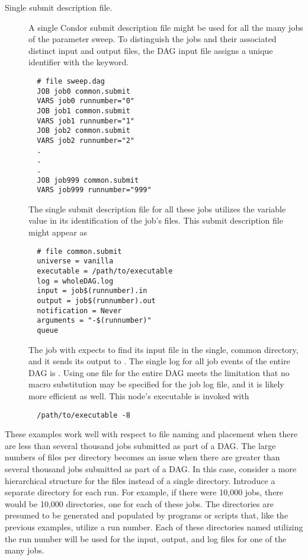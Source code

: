 \begin{description}
\item[Single submit description file.]
A single Condor submit description file might be used for all the many
jobs of the parameter sweep.
To distinguish the jobs and their associated distinct input and output files,
the DAG input file assigns a unique identifier with the  keyword.
\begin{verbatim}
  # file sweep.dag
  JOB job0 common.submit
  VARS job0 runnumber="0"
  JOB job1 common.submit
  VARS job1 runnumber="1"
  JOB job2 common.submit
  VARS job2 runnumber="2"
  .
  .
  .
  JOB job999 common.submit
  VARS job999 runnumber="999"
\end{verbatim}

The single submit description file for all these jobs utilizes the
 variable value in its identification of the job's
files. 
This submit description file might appear as
\begin{verbatim}
  # file common.submit
  universe = vanilla
  executable = /path/to/executable
  log = wholeDAG.log
  input = job$(runnumber).in
  output = job$(runnumber).out
  notification = Never
  arguments = "-$(runnumber)"
  queue
\end{verbatim}
The job with  expects to find its input file  
in the single, common directory, and it 
sends its output to .
The single log for all job events of the entire DAG is .
Using one file for the entire DAG meets the limitation that no macro
substitution may be specified for the job log file, 
and it is likely more efficient as well. 
This node's executable is invoked with
\begin{verbatim}
  /path/to/executable -8
\end{verbatim}

\end{description}

These examples work well with respect to file naming and placement
when there are less than several thousand jobs submitted as part
of a DAG.
The large numbers of files per directory becomes an issue when there
are greater than several thousand jobs submitted as part of a DAG.
In this case,
consider a more hierarchical structure for the files instead of a single
directory.
Introduce a separate directory for each run.
For example, if there were 10,000 jobs, there would be
10,000 directories, one for each of these jobs.
The directories are presumed to be generated and populated by 
programs or scripts that,
like the previous examples, utilize a run number.
Each of these directories named utilizing the run number will be used
for the input, output, and log files for one of the many jobs.

